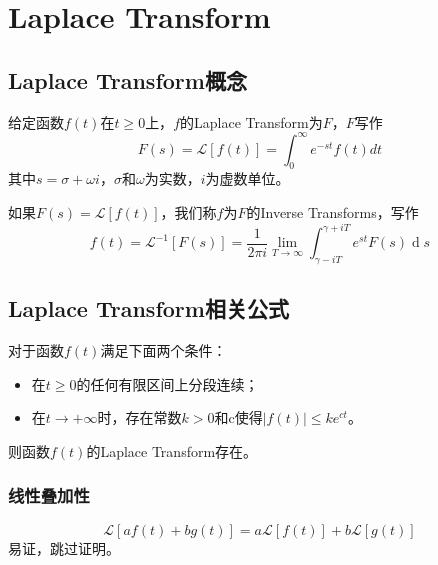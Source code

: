 \documentclass[lang=cn,10pt]{elegantbook}
\newcommand\mc[1]{\mathcal{#1}}
\begin{document}
\section{Laplace Transform}

\subsection{Laplace Transform概念}
\begin{definition}
	给定函数$f(t)$在$t \geq 0$上，$f$的Laplace Transform为$F$，$F$写作
	\begin{equation}
		F(s)=\mathcal{L}[f(t)]=\int_{0}^{\infty}e^{-st}f(t)dt
	\end{equation}
	其中$s = \sigma + \omega i$，$\sigma$和$\omega$为实数，$i$为虚数单位。
\end{definition}

\begin{definition}
	如果$F(s) = \mc{L}[f(t)]$，我们称$f$为$F$的Inverse Transforms，写作
	\begin{equation}
		f(t) = \mc{L}^{-1}[F(s)]=
		\frac1{2\pi i}\lim_{T\to\infty}\int_{\gamma-iT}^{\gamma+iT}e^{st}F(s)\operatorname{d}s
	\end{equation}
\end{definition}

\subsection{Laplace Transform相关公式}
\begin{theorem}
	对于函数$f(t)$满足下面两个条件：
	\begin{itemize}
		\item 在$t\geq 0$的任何有限区间上分段连续；
		\item 在$t \rightarrow +\infty $时，存在常数$k > 0$和c使得$|f(t)|\leq ke^{ct}$。
	\end{itemize}
	则函数$f(t)$的Laplace Transform存在。
\end{theorem}

\subsubsection{线性叠加性}
\begin{equation}
	\mathcal{L}\left[af\left(t\right)+bg\left(t\right)\right]=
	a\mathcal{L}\left[f\left(t\right)\right]+b\mathcal{L}\left[g\left(t\right)\right]
\end{equation}
易证，跳过证明。
\end{document}
